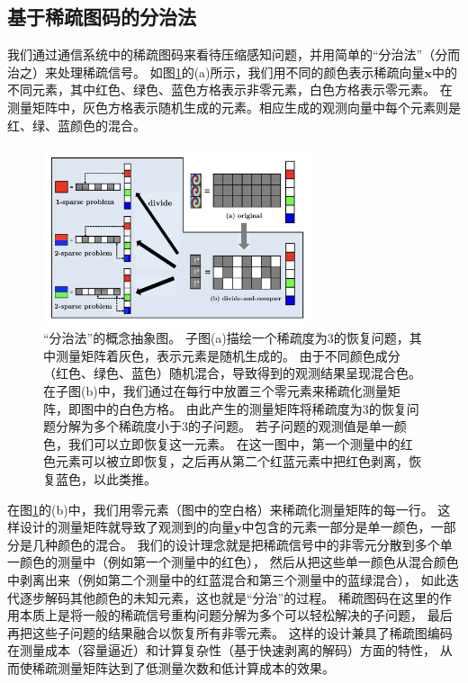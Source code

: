 \documentclass[AutoFakeBold]{LZUThesis}
\begin{document}
\subsection{基于稀疏图码的分治法}
\label{d_n_c}

我们通过通信系统中的稀疏图码来看待压缩感知问题，并用简单的“分治法”（分而治之）来处理稀疏信号。
如图\ref{fig_divide_conquer}的(a)所示，我们用不同的颜色表示稀疏向量$\mathbf{x}$中的不同元素，其中红色、绿色、蓝色方格表示非零元素，白色方格表示零元素。
在测量矩阵中，灰色方格表示随机生成的元素。相应生成的观测向量中每个元素则是红、绿、蓝颜色的混合。
\begin{figure}[H]
    \centering
    \includegraphics[width=0.7\textwidth]{figures/d_n_c.png}
    \caption{“分治法”的概念抽象图。
    子图(a)描绘一个稀疏度为3的恢复问题，其中测量矩阵着灰色，表示元素是随机生成的。
    由于不同颜色成分（红色、绿色、蓝色）随机混合，导致得到的观测结果呈现混合色。
    在子图(b)中，我们通过在每行中放置三个零元素来稀疏化测量矩阵，即图中的白色方格。
    由此产生的测量矩阵将稀疏度为3的恢复问题分解为多个稀疏度小于3的子问题。
    若子问题的观测值是单一颜色，我们可以立即恢复这一元素。
    在这一图中，第一个测量中的红色元素可以被立即恢复，之后再从第二个红蓝元素中把红色剥离，恢复蓝色，以此类推。}
    \label{fig_divide_conquer}
\end{figure}
在图\ref{fig_divide_conquer}的(b)中，我们用零元素（图中的空白格）来稀疏化测量矩阵的每一行。
这样设计的测量矩阵就导致了观测到的向量$\mathbf{y}$中包含的元素一部分是单一颜色，一部分是几种颜色的混合。
我们的设计理念就是把稀疏信号中的非零元分散到多个单一颜色的测量中（例如第一个测量中的红色），
然后从把这些单一颜色从混合颜色中剥离出来（例如第二个测量中的红蓝混合和第三个测量中的蓝绿混合），
如此迭代逐步解码其他颜色的未知元素，这也就是“分治”的过程。
稀疏图码在这里的作用本质上是将一般的稀疏信号重构问题分解为多个可以轻松解决的子问题，
最后再把这些子问题的结果融合以恢复所有非零元素。
这样的设计兼具了稀疏图编码在测量成本（容量逼近）和计算复杂性（基于快速剥离的解码）方面的特性，
从而使稀疏测量矩阵达到了低测量次数和低计算成本的效果。
\end{document}
